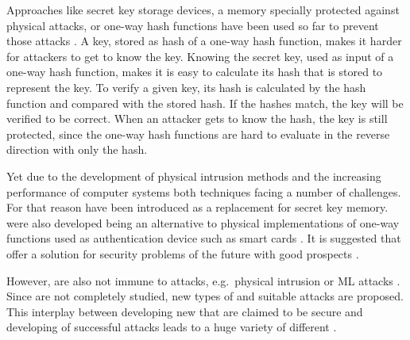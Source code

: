 Approaches like secret key storage devices, a memory specially protected against physical attacks, or one-way hash functions have been used so far to prevent those attacks \cite{Pappu2001PhysicalFunctions}. %
A key, stored as hash of a one-way hash function, makes it harder for attackers to get to know the key. 
Knowing the secret key, used as input of a one-way hash function, makes it is easy to calculate its hash that is stored to represent the key.
To verify a given key, its hash is calculated by the hash function and compared with the stored hash.
If the hashes match, the key will be verified to be correct.
When an attacker gets to know the hash, the key is still protected, since the one-way hash functions are hard to evaluate in the reverse direction with only the hash. %

Yet due to the development of physical intrusion methods and the increasing performance of computer systems both techniques facing a number of challenges.
For that reason \pufs have been introduced as a replacement for secret key memory.
\pufs were also developed being an alternative to physical implementations of one-way functions used as authentication device such as smart cards \cite{Pappu2001PhysicalFunctions}.
It is suggested that \pufs offer a solution for security problems of the future with good prospects \cite{Tajik2014PhysicalPUFs}.


However, \pufs are also not immune to attacks, e.g.\ physical intrusion or \acl{ML} attacks \cite{Tajik2014PhysicalPUFs,Ruhrmair2010ModelingFunctions,Becker2015ThePUFs,Helfmeier2014PhysicalFunctions}.
Since \pufs are not completely studied, new types of \pufs and suitable attacks are proposed. %
This interplay between developing new \pufs that are claimed to be secure and developing of successful attacks leads to a huge variety of different \pufs \cite{Ruhrmair2014PUFOverview}.


